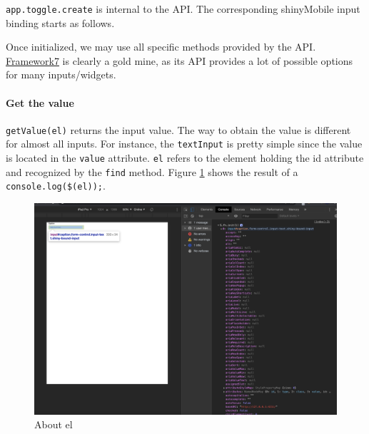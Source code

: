 \documentclass[]{book}
\newenvironment{Shaded}{\begin{snugshade}}{\end{snugshade}}
\newcommand{\AttributeTok}[1]{\textcolor[rgb]{0.77,0.63,0.00}{#1}}
\newcommand{\CommentTok}[1]{\textcolor[rgb]{0.56,0.35,0.01}{\textit{#1}}}
\newcommand{\DataTypeTok}[1]{\textcolor[rgb]{0.13,0.29,0.53}{#1}}
\newcommand{\KeywordTok}[1]{\textcolor[rgb]{0.13,0.29,0.53}{\textbf{#1}}}
\newcommand{\NormalTok}[1]{#1}
\newcommand{\OperatorTok}[1]{\textcolor[rgb]{0.81,0.36,0.00}{\textbf{#1}}}
\newcommand{\VariableTok}[1]{\textcolor[rgb]{0.00,0.00,0.00}{#1}}
\let\oldparagraph\paragraph
\renewcommand{\paragraph}[1]{\oldparagraph{#1}\mbox{}}
\begin{document}
\texttt{app.toggle.create} is internal to the API. The corresponding shinyMobile input binding starts as follows.

\begin{Shaded}
\end{Shaded}

Once initialized, we may use all specific methods provided by the API. \href{https://framework7.io}{Framework7} is clearly a gold mine, as its API provides a lot of possible options for many inputs/widgets.

\hypertarget{get-the-value}{%
\paragraph{Get the value}\label{get-the-value}}

\texttt{getValue(el)} returns the input value. The way to obtain the value is different for almost all inputs. For instance, the \texttt{textInput} is pretty simple since the value is located in the \texttt{value} attribute. \texttt{el} refers to the element holding the id attribute and recognized by the \texttt{find} method. Figure \ref{fig:shiny-el} shows the result of a \texttt{console.log(\$(el));}.

\begin{figure}
\includegraphics[width=35.5in]{images/survival-kit/shiny-el} \caption{About el}\label{fig:shiny-el}
\end{figure}
\end{document}
